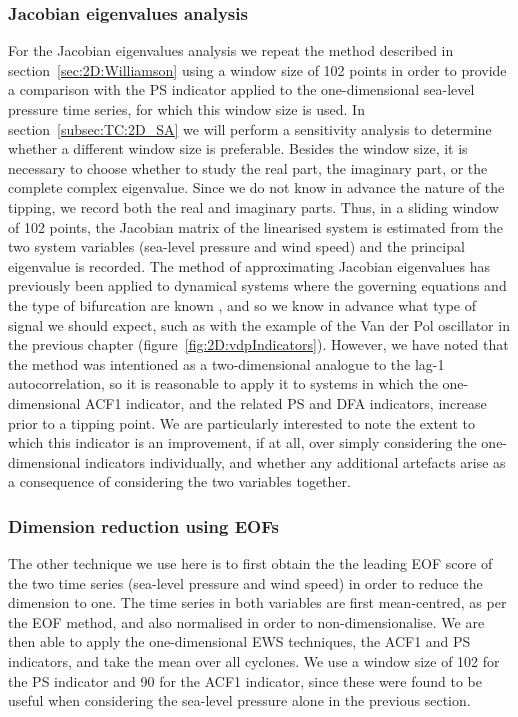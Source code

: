 \subsubsection{Jacobian eigenvalues analysis}
For the Jacobian eigenvalues analysis we repeat the method described in section~\ref{sec:2D:Williamson} using a window size of 102 points in order to provide a comparison with the PS indicator applied to the one-dimensional sea-level pressure time series, for which this window size is used. In section~\ref{subsec:TC:2D_SA} we will perform a sensitivity analysis to determine whether a different window size is preferable. Besides the window size, it is necessary to choose whether to study the real part, the imaginary part, or the complete complex eigenvalue. Since we do not know in advance the nature of the tipping, we record both the real and imaginary parts. Thus, in a sliding window of 102 points, the Jacobian matrix of the linearised system is estimated from the two system variables (sea-level pressure and wind speed) and the principal eigenvalue is recorded. The method of approximating Jacobian eigenvalues has previously been applied to dynamical systems where the governing equations and the type of bifurcation are known \citep{williamson2015}, and so we know in advance what type of signal we should expect, such as with the example of the Van der Pol oscillator in the previous chapter (figure~\ref{fig:2D:vdpIndicators}). However, we have noted that the method was intentioned as a two-dimensional analogue to the lag-1 autocorrelation, so it is reasonable to apply it to systems in which the one-dimensional ACF1 indicator, and the related PS and DFA indicators, increase prior to a tipping point. We are particularly interested to note the extent to which this indicator is an improvement, if at all, over simply considering the one-dimensional indicators individually, and whether any additional artefacts arise as a consequence of considering the two variables together.

\subsubsection{Dimension reduction using EOFs}
The other technique we use here is to first obtain the the leading EOF score of the two time series (sea-level pressure and wind speed) in order to reduce the dimension to one. The time series in both variables are first mean-centred, as per the EOF method, and also normalised in order to non-dimensionalise. We are then able to apply the one-dimensional EWS techniques, the ACF1 and PS indicators, and take the mean over all cyclones. We use a window size of 102 for the PS indicator and 90 for the ACF1 indicator, since these were found to be useful when considering the sea-level pressure alone in the previous section.


